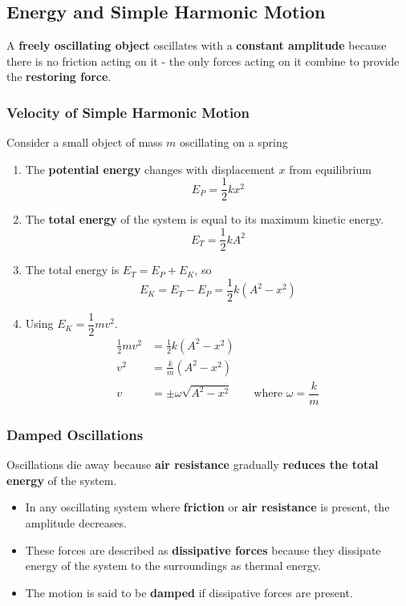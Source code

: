 \subsection{Energy and Simple Harmonic Motion}

A \textbf{freely oscillating object} oscillates with a \textbf{constant amplitude} because there is no friction acting on it - the only forces acting on it combine to provide the \textbf{restoring force}.

\subsubsection*{Velocity of Simple Harmonic Motion}

Consider a small object of mass $m$ oscillating on a spring
\begin{enumerate}
    \item The \textbf{potential energy} changes with displacement $x$ from equilibrium
        $$E_P=\frac{1}{2}kx^2$$
    \item The \textbf{total energy} of the system is equal to its maximum kinetic energy.
        $$E_T=\frac{1}{2}kA^2$$
    \item The total energy is $E_T=E_P+E_K$, so
        $$E_K=E_T-E_P=\frac{1}{2}k(A^2-x^2)$$
    \item Using $E_K=\dfrac{1}{2}mv^2$.
        \begin{align*}
            \frac{1}{2}mv^2&=\frac{1}{2}k(A^2-x^2)\\
            v^2&=\frac{k}{m}(A^2-x^2)\\
            v&=\pm\omega\sqrt{A^2-x^2}\qquad\text{where $\omega=\dfrac{k}{m}$}
        \end{align*}
\end{enumerate}

\subsubsection*{Damped Oscillations}

Oscillations die away because \textbf{air resistance} gradually \textbf{reduces the total energy} of the system.

\begin{itemize}
    \item In any oscillating system where \textbf{friction} or \textbf{air resistance} is present, the amplitude decreases.
    \item These forces are described as \textbf{dissipative forces} because they dissipate energy of the system to the surroundings as thermal energy.
    \item The motion is said to be \textbf{damped} if dissipative forces are present.
\end{itemize}

